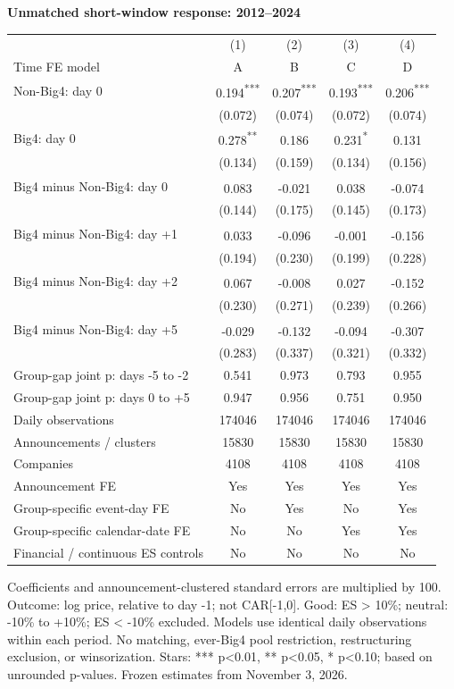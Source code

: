 \documentclass[10pt]{article}
\newcommand{\sym}[1]{\textsuperscript{#1}}\pagestyle{empty}
\begin{document}
\noindent\textbf{Unmatched short-window response: 2012--2024}\par\medskip
\setlength{\tabcolsep}{3pt}\renewcommand{\arraystretch}{1.1}
\noindent\begin{tabular*}{\textwidth}{@{\extracolsep{\fill}}lcccc@{}}\toprule
 & (1) & (2) & (3) & (4) \\
Time FE model & A & B & C & D \\\midrule
Non-Big4: day 0 & 0.194\sym{***} & 0.207\sym{***} & 0.193\sym{***} & 0.206\sym{***} \\
 & (0.072) & (0.074) & (0.072) & (0.074) \\
Big4: day 0 & 0.278\sym{**} & 0.186\sym{} & 0.231\sym{*} & 0.131\sym{} \\
 & (0.134) & (0.159) & (0.134) & (0.156) \\
Big4 minus Non-Big4: day 0 & 0.083\sym{} & -0.021\sym{} & 0.038\sym{} & -0.074\sym{} \\
 & (0.144) & (0.175) & (0.145) & (0.173) \\
Big4 minus Non-Big4: day +1 & 0.033\sym{} & -0.096\sym{} & -0.001\sym{} & -0.156\sym{} \\
 & (0.194) & (0.230) & (0.199) & (0.228) \\
Big4 minus Non-Big4: day +2 & 0.067\sym{} & -0.008\sym{} & 0.027\sym{} & -0.152\sym{} \\
 & (0.230) & (0.271) & (0.239) & (0.266) \\
Big4 minus Non-Big4: day +5 & -0.029\sym{} & -0.132\sym{} & -0.094\sym{} & -0.307\sym{} \\
 & (0.283) & (0.337) & (0.321) & (0.332) \\
Group-gap joint p: days -5 to -2 & 0.541 & 0.973 & 0.793 & 0.955 \\
Group-gap joint p: days 0 to +5 & 0.947 & 0.956 & 0.751 & 0.950 \\
Daily observations & 174046 & 174046 & 174046 & 174046 \\
Announcements / clusters & 15830 & 15830 & 15830 & 15830 \\
Companies & 4108 & 4108 & 4108 & 4108 \\
Announcement FE & Yes & Yes & Yes & Yes \\
Group-specific event-day FE & No & Yes & No & Yes \\
Group-specific calendar-date FE & No & No & Yes & Yes \\
Financial / continuous ES controls & No & No & No & No \\
\bottomrule\end{tabular*}\par\medskip
\noindent\footnotesize Coefficients and announcement-clustered standard errors are multiplied by 100. Outcome: log price, relative to day -1; not CAR[-1,0]. Good: ES > 10\%; neutral: -10\% to +10\%; ES < -10\% excluded. Models use identical daily observations within each period. No matching, ever-Big4 pool restriction, restructuring exclusion, or winsorization. Stars: *** p<0.01, ** p<0.05, * p<0.10; based on unrounded p-values. Frozen estimates from November 3, 2026.\end{document}
\end{document}
